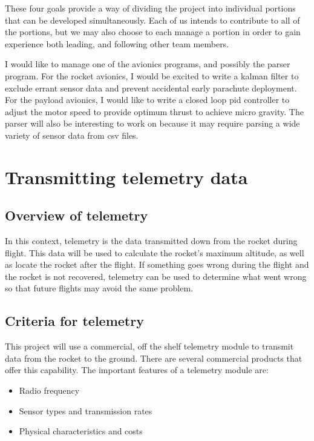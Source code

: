 \documentclass[onecolumn, draftclsnofoot, 10pt, compsoc]{IEEEtran}
\begin{document}
These four goals provide a way of dividing the project into individual portions that can be developed simultaneously.  Each of us intends to contribute to all of the portions, but we may also choose to each manage a portion in order to gain experience both leading, and following other team members.

I would like to manage one of the avionics programs, and possibly the parser program.  For the rocket avionics, I would be excited to write a kalman filter to exclude errant sensor data and prevent accidental early parachute deployment.  For the payload avionics, I would like to write a closed loop pid controller to adjust the motor speed to provide optimum thrust to achieve micro gravity.  The parser will also be interesting to work on because it may require parsing a wide variety of sensor data from csv files.


\section{Transmitting telemetry data}

\subsection{Overview of telemetry}
In this context, telemetry is the data transmitted down from the rocket during flight.  This data will be used to calculate the rocket's maximum altitude, as well as locate the rocket after the flight.  If something goes wrong during the flight and the rocket is not recovered, telemetry can be used to determine what went wrong so that future flights may avoid the same problem.

\subsection{Criteria for telemetry}
This project will use a commercial, off the shelf telemetry module to transmit data from the rocket to the ground.  There are several commercial products that offer this capability.  The important features of a telemetry module are:

\begin{itemize}
	\item Radio frequency
    \item Sensor types and transmission rates
    \item Physical characteristics and costs
\end{itemize}
\end{document}
